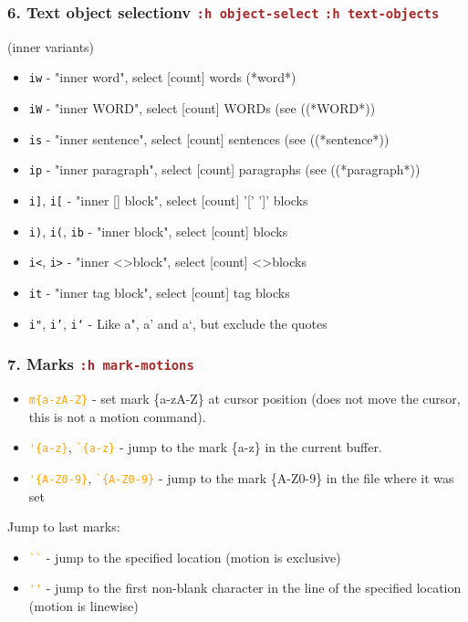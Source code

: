 \documentclass{beamer}
\newcommand{\vimnormal}[1]{\texttt{\textcolor{orange}{#1}}}
\newcommand{\vimcommand}[1]{\texttt{\textcolor{brown}{#1}}}
\newcommand{\vimhelp}[1]{\vimcommand{:h #1}}
\begin{document}
\begin{frame}
    \frametitle{6. Text object selectionv \vimhelp{object-select} \vimhelp{text-objects}}
    (inner variants)
    \begin{itemize}
        \item \texttt{iw}                                 - "inner word", select [count] words (\textrm{*word*})
        \item \texttt{iW}                                 - "inner WORD", select [count] WORDs (see (\textrm(*WORD*))
        \item \texttt{is}                                 - "inner sentence", select [count] sentences (see (\textrm(*sentence*))
        \item \texttt{ip}                                 - "inner paragraph", select [count] paragraphs (see (\textrm(*paragraph*))
        \item \texttt{i]}, \texttt{i[}                    - "inner [] block", select [count] '[' ']' blocks
        \item \texttt{i)}, \texttt{i(}, \texttt{ib}       - "inner block", select [count] blocks
        \item \texttt{i\textless}, \texttt{i\textgreater} - "inner \textless\textgreater block", select [count] \textless\textgreater blocks
        \item \texttt{it}                                 - "inner tag block", select [count] tag blocks
        \item \texttt{i"}, \texttt{i'}, \texttt{i`}       - Like a", a' and a`, but exclude the quotes
    \end{itemize}
\end{frame}

\begin{frame}[fragile]
    \frametitle{7. Marks \vimhelp{mark-motions}}
    \begin{itemize}
        \item \vimnormal{m\{a-zA-Z\}}                                - set mark \{a-zA-Z\} at cursor position (does not move the cursor, this is not a motion command).
        \item \vimnormal{\'{}\{a-z\}}, \vimnormal{\`{}\{a-z\}}       - jump to the mark \{a-z\} in the current buffer.
        \item \vimnormal{\'{}\{A-Z0-9\}}, \vimnormal{\`{}\{A-Z0-9\}} - jump to the mark \{A-Z0-9\} in the file where it was set
    \end{itemize}
    Jump to last marks:
    \begin{itemize}
        \item \vimnormal{\`{}\`{}} - jump to the specified location (motion is exclusive)
        \item \vimnormal{\'{}\'{}} - jump to the first non-blank character in the line of the specified location (motion is linewise)
    \end{itemize}
\end{frame}
\end{document}
